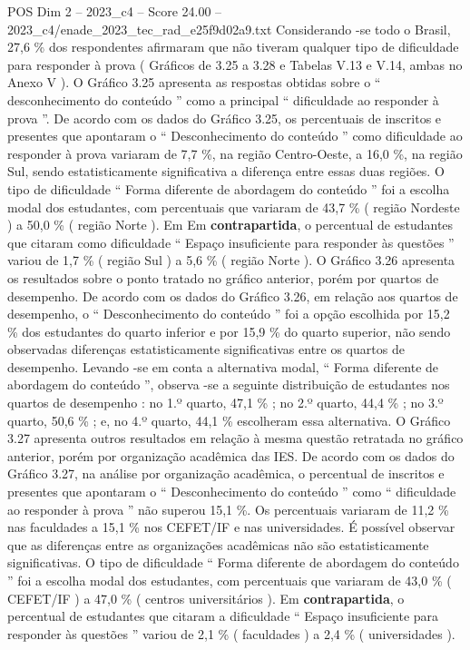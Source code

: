 \begin{textsample}{POS Dim 2 – 2023\_c4 – Score 24.00 – 2023\_c4/enade\_2023\_tec\_rad\_e25f9d02a9.txt}
Considerando -se todo o Brasil, 27,6 \% dos respondentes afirmaram que não tiveram qualquer tipo de dificuldade para responder à prova ( Gráficos de 3.25 a 3.28 e Tabelas V.13 e V.14, ambas no Anexo V ).
O Gráfico 3.25 apresenta as respostas obtidas sobre o “ desconhecimento do conteúdo ” como a principal “ dificuldade ao responder à prova ”.
De acordo com os dados do Gráfico 3.25, os percentuais de inscritos e presentes que apontaram o “ Desconhecimento do conteúdo ” como dificuldade ao responder à prova variaram de 7,7 \%, na região Centro-Oeste, a 16,0 \%, na região Sul, sendo estatisticamente significativa a diferença entre essas duas regiões.
O tipo de dificuldade “ Forma diferente de abordagem do conteúdo ” foi a escolha modal dos estudantes, com percentuais que variaram de 43,7 \% ( região Nordeste ) a 50,0 \% ( região Norte ).
Em Em \textbf{contrapartida}, o percentual de estudantes que citaram como dificuldade “ Espaço insuficiente para responder às questões ” variou de 1,7 \% ( região Sul ) a 5,6 \% ( região Norte ).
O Gráfico 3.26 apresenta os resultados sobre o ponto tratado no gráfico anterior, porém por quartos de desempenho.
De acordo com os dados do Gráfico 3.26, em relação aos quartos de desempenho, o “ Desconhecimento do conteúdo ” foi a opção escolhida por 15,2 \% dos estudantes do quarto inferior e por 15,9 \% do quarto superior, não sendo observadas diferenças estatisticamente significativas entre os quartos de desempenho.
Levando -se em conta a alternativa modal, “ Forma diferente de abordagem do conteúdo ”, observa -se a seguinte distribuição de estudantes nos quartos de desempenho : no 1.º quarto, 47,1 \% ; no 2.º quarto, 44,4 \% ; no 3.º quarto, 50,6 \% ; e, no 4.º quarto, 44,1 \% escolheram essa alternativa.
O Gráfico 3.27 apresenta outros resultados em relação à mesma questão retratada no gráfico anterior, porém por organização acadêmica das IES.
De acordo com os dados do Gráfico 3.27, na análise por organização acadêmica, o percentual de inscritos e presentes que apontaram o “ Desconhecimento do conteúdo ” como “ dificuldade ao responder à prova ” não superou 15,1 \%.
Os percentuais variaram de 11,2 \% nas faculdades a 15,1 \% nos CEFET/IF e nas universidades.
É possível observar que as diferenças entre as organizações acadêmicas não são estatisticamente significativas.
O tipo de dificuldade “ Forma diferente de abordagem do conteúdo ” foi a escolha modal dos estudantes, com percentuais que variaram de 43,0 \% ( CEFET/IF ) a 47,0 \% ( centros universitários ).
Em \textbf{contrapartida}, o percentual de estudantes que citaram a dificuldade “ Espaço insuficiente para responder às questões ” variou de 2,1 \% ( faculdades ) a 2,4 \% ( universidades ).

\end{textsample}
